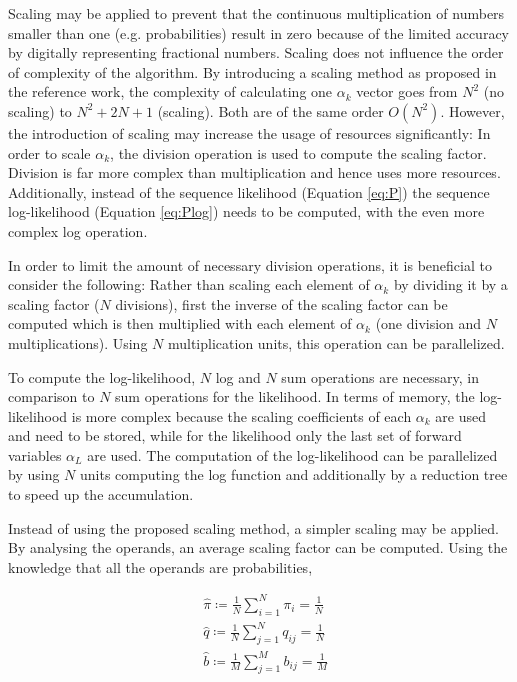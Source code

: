 \documentclass[mscthesis]{usiinfthesis}
\begin{document}
Scaling may be applied to prevent that the continuous multiplication of numbers
smaller than one (e.g. probabilities) result in zero because of the limited
accuracy by digitally representing fractional numbers. Scaling does not
influence the order of complexity of the algorithm. By introducing a scaling
method as proposed in the reference work, the complexity of calculating one
$\alpha_k$ vector goes from $N^2$ (no scaling) to $N^2 + 2N + 1$ (scaling). Both
are of the same order $O(N^2)$. However, the introduction of scaling may
increase the usage of resources significantly: In order to scale $\alpha_k$,
the division operation is used to compute the scaling factor. Division is far
more complex than multiplication and hence uses more resources. Additionally,
instead of the sequence likelihood (Equation \ref{eq:P}) the sequence
log-likelihood (Equation \ref{eq:Plog}) needs to be computed, with the even
more complex log operation.

In order to limit the amount of necessary division operations, it is beneficial
to consider the following: Rather than scaling each element of $\alpha_k$ by
dividing it by a scaling factor ($N$ divisions), first the inverse of the
scaling factor can be computed which is then multiplied with each element of
$\alpha_k$ (one division and $N$ multiplications). Using $N$ multiplication
units, this operation can be parallelized.

To compute the log-likelihood, $N$ log and $N$ sum operations are necessary, in
comparison to $N$ sum operations for the likelihood. In terms of memory, the
log-likelihood is more complex because the scaling coefficients of each
$\alpha_k$ are used and need to be stored, while for the likelihood only the
last set of forward variables $\alpha_L$ are used. The computation of the
log-likelihood can be parallelized by using $N$ units computing the log
function and additionally by a reduction tree to speed up the accumulation.

Instead of using the proposed scaling method, a simpler scaling may be applied.
By analysing the operands, an average scaling factor can be computed. Using the
knowledge that all the operands are probabilities,

\begin{equation}\begin{split}
    \label{eq:scaling_sum}
    &\hat{\pi} \coloneqq \frac{1}{N}\sum\limits_{i=1}^{N} \pi_i = \frac{1}{N} \\
    &\hat{q} \coloneqq \frac{1}{N}\sum\limits_{j=1}^{N} q_{ij} = \frac{1}{N} \\
    &\hat{b} \coloneqq \frac{1}{M}\sum\limits_{j=1}^{M} b_{ij} = \frac{1}{M}
\end{split}\end{equation}
\end{document}
